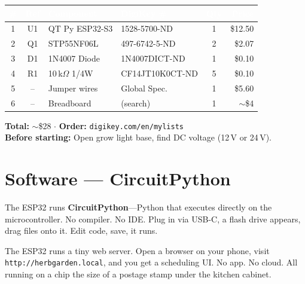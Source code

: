 \documentclass[10pt, letterpaper]{article}
\begin{document}
\begin{landscape}
\begin{minipage}[t]{0.50\linewidth}
\renewcommand{\arraystretch}{1.1}
{\small
\begin{tabularx}{\linewidth}{c c l >{\ttfamily\scriptsize}l c r}
\toprule
\rowcolor{darkbg}
\textcolor{white}{\bfseries \#} &
\textcolor{white}{\bfseries Ref} &
\textcolor{white}{\bfseries Component} &
\textcolor{white}{\bfseries\rmfamily DigiKey \#} &
\textcolor{white}{\bfseries Qty} &
\textcolor{white}{\bfseries Price} \\
\midrule
\rowcolor{lightbg}
1 & U1 & QT Py ESP32-S3 & 1528-5700-ND & 1 & \$12.50 \\
2 & Q1 & STP55NF06L & 497-6742-5-ND & 2 & \$2.07 \\
\rowcolor{lightbg}
3 & D1 & 1N4007 Diode & 1N4007DICT-ND & 1 & \$0.10 \\
4 & R1 & 10\,k$\Omega$ \textrm{1/4W} & CF14JT10K0CT-ND & 5 & \$0.10 \\
\rowcolor{lightbg}
5 & -- & Jumper wires & \textrm{Global Spec.} & 1 & \$5.60 \\
6 & -- & Breadboard & \textrm{(search)} & 1 & $\sim$\$4 \\
\bottomrule
\end{tabularx}
}

\vspace{3pt}
{\scriptsize\color{textgray}
\textbf{Total:} $\sim$\$28 \enspace$\cdot$\enspace
\textbf{Order:} \texttt{digikey.com/en/mylists}\\
\textbf{Before starting:} Open grow light base, find DC voltage (12\,V or 24\,V).}

\end{minipage}

\end{landscape}


\section{Software --- CircuitPython}

The ESP32 runs \textbf{CircuitPython}---Python that executes directly on the microcontroller.
No compiler. No IDE. Plug in via USB-C, a flash drive appears, drag files onto it.
Edit code, save, it runs.

\begin{calloutbox}[title=Why this is cool]
The ESP32 runs a tiny web server. Open a browser on your phone, visit
\texttt{http://herbgarden.local}, and you get a scheduling UI.
No app. No cloud. All running on a chip the size of a postage stamp under the kitchen cabinet.
\end{calloutbox}
\end{document}

